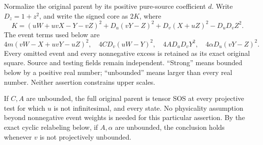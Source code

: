 \label{component:p89fd3edb3edd}

\label{p89fd3edb3edd:sec:r6-c1-common-remote}
Normalize the original parent by its positive pure-source coefficient $d$.
Write $D_z=1+z^2$, and write the signed core as $2K$, where
\[
 K=(uW+uvX-Y-vZ)^2+D_u(vY-Z)^2+D_v(X+uZ)^2-D_uD_vZ^2.
 \tag{CE1}
\]
The event terms used below are
\[
4m(vW-X+uvY-uZ)^2,\quad4CD_v(uW-Y)^2,
\quad4AD_uD_vY^2,\quad4\alpha D_u(vY-Z)^2.
\]
Every omitted event and every nonnegative excess is retained as its exact
original square. Source and testing fields remain independent. ``Strong''
means bounded below by a positive real number; ``unbounded'' means larger
than every real number. Neither assertion constrains upper scales.

\begin{theorem}
If $C,A$ are unbounded, the full original parent is tensor SOS at every
projective test for which $u$ is not infinitesimal, and every state.
No physicality assumption beyond nonnegative event weights is needed for
this particular assertion. By the exact cyclic relabeling below, if
$A,\alpha$ are unbounded, the conclusion holds whenever $v$ is not
projectively unbounded.
\end{theorem}
